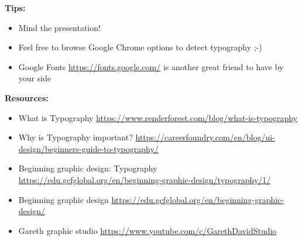 \textbf{Tips:}

\begin{itemize}
\item Mind the presentation!
\item Feel free to browse Google Chrome options to detect typography ;-)
\item Google Fonts \url{https://fonts.google.com/} is another great friend to have by your side
\end{itemize}

\textbf{Resources:}

\begin{itemize}
\item What is Typography \url{https://www.renderforest.com/blog/what-is-typography}
\item Why is Typography important? \url{https://careerfoundry.com/en/blog/ui-design/beginners-guide-to-typography/}
\item Beginning graphic design: Typography \url{https://edu.gcfglobal.org/en/beginning-graphic-design/typography/1/}
\item Beginning graphic design \url{https://edu.gcfglobal.org/en/beginning-graphic-design/}
\item Gareth graphic studio \url{https://www.youtube.com/c/GarethDavidStudio}
\end{itemize}


